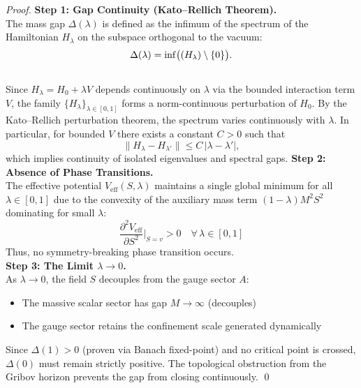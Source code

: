 \documentclass[11pt,a4paper]{article}
\let\spec\relax
\DeclareMathOperator{\spec}{spec}
\newcommand{\spec}{\mathrm{spec}}
\theoremstyle{plain}
\theoremstyle{definition}
\begin{document}
\begin{proof}\vspace{0.3em}
\textbf{Step 1: Gap Continuity (Kato--Rellich Theorem).}
\vspace{0.3em}\\
The mass gap $\Delta(\lambda)$ is defined as the infimum of the spectrum of the Hamiltonian $H_\lambda$ on the subspace orthogonal to the vacuum:
\begin{equation}
\Delta(\lambda) = \inf\bigl(\spec(H_\lambda) \setminus \{0\}\bigr).
\end{equation}
\vspace{0.3em}\\
Since $H_\lambda = H_0 + \lambda V$ depends continuously on $\lambda$ via the bounded interaction term $V$, the family $\{H_\lambda\}_{\lambda\in[0,1]}$ forms a norm-continuous perturbation of $H_0$. By the Kato--Rellich perturbation theorem, the spectrum varies continuously with $\lambda$. In particular, for bounded $V$ there exists a constant $C>0$ such that
\begin{equation}
\|H_\lambda - H_{\lambda'}\| \leq C\,|\lambda - \lambda'|,
\end{equation}
which implies continuity of isolated eigenvalues and spectral gaps.
\newpage \vspace{0.3em}\vspace{0.3em}
\textbf{Step 2: Absence of Phase Transitions.}
\vspace{0.3em}\\
The effective potential $V_{\mathrm{eff}}(S, \lambda)$ maintains a single global minimum for all $\lambda \in [0,1]$ due to the convexity of the auxiliary mass term $(1-\lambda)M^2 S^2$ dominating for small $\lambda$:
\begin{equation}
\frac{\partial^2 V_{\mathrm{eff}}}{\partial S^2}\bigg|_{S=v} > 0
\quad \forall\, \lambda \in [0,1]
\end{equation}
Thus, no symmetry-breaking phase transition occurs.
\vspace{0.8em}\\
\textbf{Step 3: The Limit $\lambda \to 0$.}
\vspace{0.3em}\\
As $\lambda \to 0$, the field $S$ decouples from the gauge sector $A$:
\begin{itemize}
\item The massive scalar sector has gap $M \to \infty$ (decouples)
\item The gauge sector retains the confinement scale generated dynamically
\end{itemize}
\vspace{0.3em}
Since $\Delta(1) > 0$ (proven via Banach fixed-point) and no critical point is crossed, $\Delta(0)$ must remain strictly positive. The topological obstruction from the Gribov horizon prevents the gap from closing continuously. \qed
\end{proof}
\end{document}
